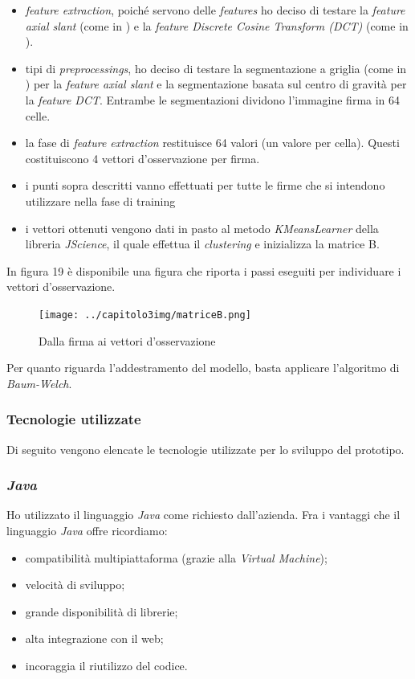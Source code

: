 \begin{itemize}
\item \emph{feature extraction}, poiché servono delle \emph{features} ho deciso di testare la \emph{feature axial slant} (come in \cite{3}) e la \emph{feature Discrete Cosine Transform (DCT)} (come in \cite{5}).
\item tipi di \emph{preprocessings}, ho deciso di testare la segmentazione a griglia (come in \cite{3}) per la \emph{feature axial slant} e la segmentazione basata sul centro di gravità per la \emph{feature DCT}\cite{5}. Entrambe le segmentazioni dividono l'immagine firma in 64 celle.
\item la fase di \emph{feature extraction} restituisce 64 valori (un valore per cella). Questi costituiscono 4 vettori d'osservazione per firma.
\item i punti sopra descritti vanno effettuati per tutte le firme che si intendono utilizzare nella fase di training
\item i vettori ottenuti vengono dati in pasto al metodo \emph{KMeansLearner} della libreria \emph{JScience}, il quale effettua il \emph{clustering} e inizializza la matrice B.
\end{itemize}
In figura 19 è disponibile una figura che riporta i passi eseguiti per individuare i  vettori d'osservazione.
\begin{figure}[H]
\centering
\texttt{[image: ../capitolo3img/matriceB.png]}
\caption{Dalla firma ai vettori d'osservazione}
\end{figure}
Per quanto riguarda l'addestramento del modello, basta applicare l'algoritmo di \emph{Baum-Welch}.

\subsubsection{Tecnologie utilizzate}
\label{3.3.3}
Di seguito vengono elencate le tecnologie utilizzate per lo sviluppo del prototipo.

\subsubsection*{\emph{Java}}
\label{3.3.3.1}
Ho utilizzato il linguaggio \emph{Java} come richiesto dall'azienda. Fra i vantaggi che il linguaggio \emph{Java} offre ricordiamo:
\begin{itemize}
\item compatibilità multipiattaforma (grazie alla \emph{Virtual Machine});
\item velocità di sviluppo;
\item grande disponibilità di librerie;
\item alta integrazione con il web;
\item incoraggia il riutilizzo del codice.
\end{itemize}

